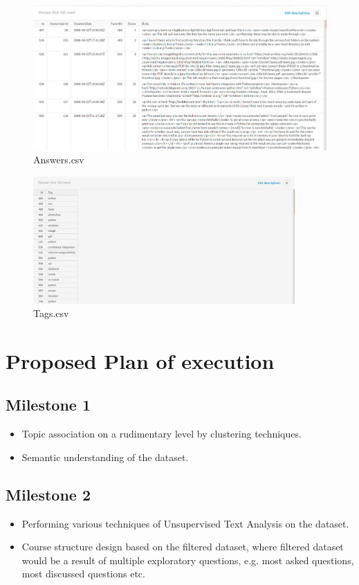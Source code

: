 \documentclass{article}
\begin{document}
\begin{figure}[h]
\centering
\includegraphics[width=12cm]{Answers}
\caption {Answers.csv}
\end{figure}


\begin{figure}[h]
\centering
\includegraphics[width=10cm]{Tags}
\caption {Tags.csv}
\end{figure}


\newpage
\bigskip
\bigskip
\section{Proposed Plan of execution}

\subsection{Milestone 1}
\begin{itemize}
\item Topic association on a rudimentary level by clustering techniques. 
\item Semantic understanding of the dataset.
\end{itemize}

\subsection{Milestone 2}
\begin{itemize}
\item Performing various techniques of Unsupervised Text Analysis on the dataset. 

\item Course structure design based on the filtered dataset, where filtered dataset would be a result of multiple exploratory questions, e.g. most asked questions, most discussed questions etc.
\end{itemize}
\end{document}
